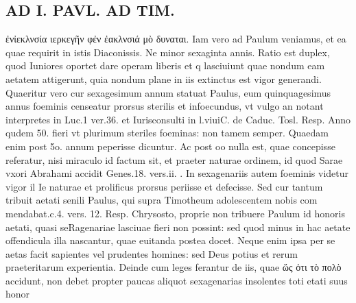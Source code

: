 \documentclass{article}
\begin{document}
\begin{pages}
\section*{AD I. PAVL. AD TIM. }
\marginpar{[ p.*24 ]}\pstart ἐνἰεκλνσία ιερκεγῆν φἐν ἐακλνσιά μὸ δυναται. Iam vero ad Paulum veniamus, et ea quae requirit in istis Diaconissis. Ne minor sexaginta annis. Ratio est duplex, quod Iuniores oportet dare operam liberis et q lasciuiunt quae nondum eam aetatem attigerunt, quia nondum plane in iis extinctus est vigor generandi. Quaeritur vero cur sexagesimum annum statuat Paulus, eum quinquagesimus annus foeminis censeatur prorsus sterilis et infoecundus, vt vulgo an notant interpretes in Luc.1 ver.36. et Iurisconsulti in l.viuiC. de Caduc. Tosl. Resp. Anno qudem 50. fieri vt plurimum steriles foeminas: non tamem semper. Quaedam enim post 5o. annum peperisse dicuntur. Ac post oo nulla est, quae concepisse referatur, nisi miraculo id factum sit, et praeter naturae ordinem, id quod Sarae vxori Abrahami accidit Genes.18. vers.ii. . In sexagenariis autem foeminis videtur vigor il Ie naturae et prolificus prorsus periisse et defecisse. Sed cur tantum tribuit aetati senili Paulus, qui supra Timotheum adolescentem nobis com mendabat.c.4. vers. 12. Resp. Chrysosto, proprie non tribuere Paulum id honoris aetati, quasi seRagenariae lasciuae fieri non possint: sed quod minus in hac aetate offendicula illa nascantur, quae euitanda postea docet. Neque enim ipsa per se aetas facit sapientes vel prudentes homines: sed Deus potius et rerum praeteritarum experientia. Deinde cum leges ferantur de iis, quae ὥς ὀτι τὸ πολὸ accidunt, non debet propter paucas aliquot sexagenarias insolentes toti etati suus honor  \pend

\end{pages}
\end{document}
